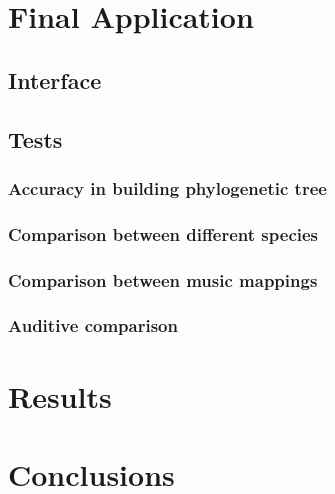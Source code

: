 \documentclass[11pt,twoside,a4paper]{report}
\begin{document}
\chapter{Final Application}
\section{Interface}
\section{Tests}
\subsection{Accuracy in building phylogenetic tree}
\subsection{Comparison between different species}
\subsection{Comparison between music mappings}
\subsection{Auditive comparison}


\chapter{Results}
\chapter{Conclusions}

%
%
\cleardoublepage
  


\cleardoublepage
\end{document}
